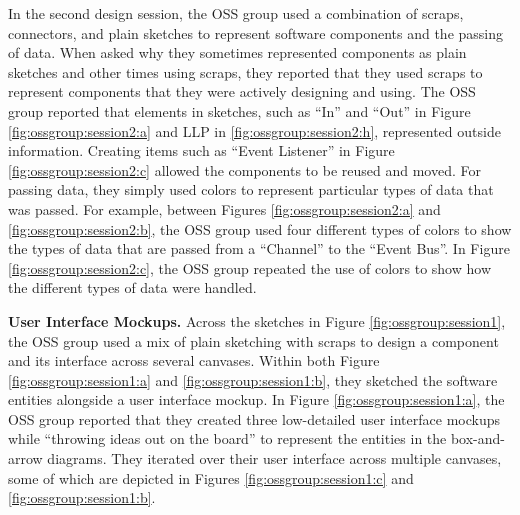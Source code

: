 In the second design session, the OSS group used a combination of scraps, connectors, and plain sketches to represent software components and the passing of data. When asked why they sometimes represented components as plain sketches and other times using scraps, they reported that they used scraps to represent components that they were actively designing and using. The OSS group reported that elements in sketches, such as ``In'' and ``Out'' in Figure \ref{fig:ossgroup:session2:a} and LLP in \ref{fig:ossgroup:session2:h}, represented outside information. Creating items such as ``Event Listener'' in Figure \ref{fig:ossgroup:session2:c} allowed the components to be reused and moved. For passing data, they simply used colors to represent particular types of data that was passed. For example, between Figures \ref{fig:ossgroup:session2:a} and \ref{fig:ossgroup:session2:b}, the OSS group used four different types of colors to show the types of data that are passed from a ``Channel'' to the ``Event Bus''. In Figure \ref{fig:ossgroup:session2:c}, the OSS group repeated the use of colors to show how the different types of data were handled.

\textbf{User Interface Mockups. } Across the sketches in Figure \ref{fig:ossgroup:session1}, the OSS group used a mix of plain sketching with scraps to design a component and its interface across several canvases. Within both Figure \ref{fig:ossgroup:session1:a} and \ref{fig:ossgroup:session1:b}, they sketched the software entities alongside a user interface mockup. In Figure \ref{fig:ossgroup:session1:a}, the OSS group reported that they created three low-detailed user interface mockups while ``throwing ideas out on the board'' to represent the entities in the box-and-arrow diagrams. They iterated over their user interface across multiple canvases, some of which are depicted in Figures \ref{fig:ossgroup:session1:c} and \ref{fig:ossgroup:session1:b}.


